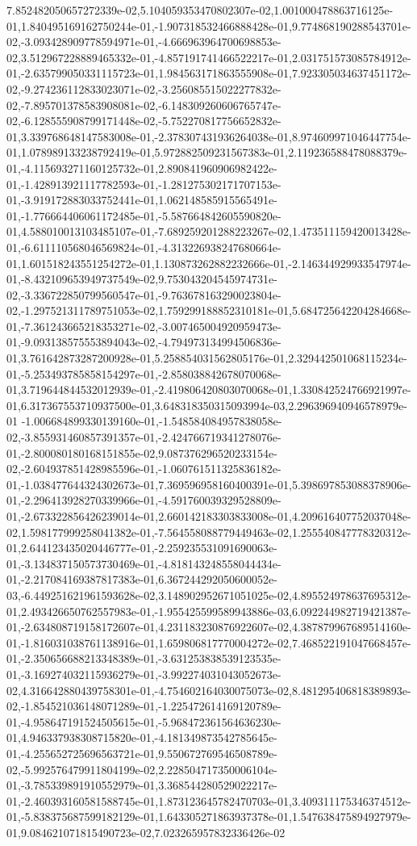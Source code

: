 7.852482050657272339e-02,5.104059353470802307e-02,1.001000478863716125e-01,1.840495169162750244e-01,-1.907318532466888428e-01,9.774868190288543701e-02,-3.093428909778594971e-01,-4.666963964700698853e-02,3.512967228889465332e-01,-4.857191741466522217e-01,2.031751573085784912e-01,-2.635799050331115723e-01,1.984563171863555908e-01,7.923305034637451172e-02,-9.274236112833023071e-02,-3.256085515022277832e-02,-7.895701378583908081e-02,-6.148309260606765747e-02,-6.128555908799171448e-02,-5.752270817756652832e-01,3.339768648147583008e-01,-2.378307431936264038e-01,8.974609971046447754e-01,1.078989133238792419e-01,5.972882509231567383e-01,2.119236588478088379e-01,-4.115693271160125732e-01,2.890841960906982422e-01,-1.428913921117782593e-01,-1.281275302171707153e-01,-3.919172883033752441e-01,1.062148585915565491e-01,-1.776664406061172485e-01,-5.587664842605590820e-01,4.588010013103485107e-01,-7.689259201288223267e-02,1.473511159420013428e-01,-6.611110568046569824e-01,-4.313226938247680664e-01,1.601518243551254272e-01,1.130873262882232666e-01,-2.146344929933547974e-01,-8.432109653949737549e-02,9.753043204545974731e-02,-3.336722850799560547e-01,-9.763678163290023804e-02,-1.297521311789751053e-02,1.759299188852310181e-01,5.684725642204284668e-01,-7.361243665218353271e-02,-3.007465004920959473e-01,-9.093138575553894043e-02,-4.794973134994506836e-01,3.761642873287200928e-01,5.258854031562805176e-01,2.329442501068115234e-01,-5.253493785858154297e-01,-2.858038842678070068e-01,3.719644844532012939e-01,-2.419806420803070068e-01,1.330842524766921997e-01,6.317367553710937500e-01,3.648318350315093994e-03,2.296396940946578979e-01
-1.006684899330139160e-01,-1.548584084957838058e-02,-3.855931460857391357e-01,-2.424766719341278076e-01,-2.800080180168151855e-02,9.087376296520233154e-02,-2.604937851428985596e-01,-1.060761511325836182e-01,-1.038477644324302673e-01,7.369596958160400391e-01,5.398697853088378906e-01,-2.296413928270339966e-01,-4.591760039329528809e-01,-2.673322856426239014e-01,2.660142183303833008e-01,4.209616407752037048e-02,1.598177999258041382e-01,-7.564558088779449463e-02,1.255540847778320312e-01,2.644123435020446777e-01,-2.259235531091690063e-01,-3.134837150573730469e-01,-4.818143248558044434e-01,-2.217084169387817383e-01,6.367244292050600052e-03,-6.449251621961593628e-02,3.148902952671051025e-02,4.895524978637695312e-01,2.493426650762557983e-01,-1.955425599589943886e-03,6.092244982719421387e-01,-2.634808719158172607e-01,4.231183230876922607e-02,4.387879967689514160e-01,-1.816031038761138916e-01,1.659806817770004272e-02,7.468522191047668457e-01,-2.350656688213348389e-01,-3.631253838539123535e-01,-3.169274032115936279e-01,-3.992274031043052673e-02,4.316642880439758301e-01,-4.754602164030075073e-02,8.481295406818389893e-02,-1.854521036148071289e-01,-1.225472614169120789e-01,-4.958647191524505615e-01,-5.968472361564636230e-01,4.946337938308715820e-01,-4.181349873542785645e-01,-4.255652725696563721e-01,9.550672769546508789e-02,-5.992576479911804199e-02,2.228504717350006104e-01,-3.785339891910552979e-01,3.368544280529022217e-01,-2.460393160581588745e-01,1.873123645782470703e-01,3.409311175346374512e-01,-5.838375687599182129e-01,1.643305271863937378e-01,1.547638475894927979e-01,9.084621071815490723e-02,7.023265957832336426e-02
